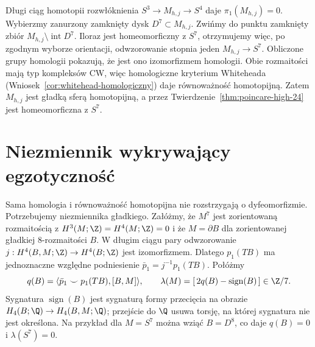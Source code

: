Długi ciąg homotopii rozwłóknienia
$S^3\to M_{h,j}\to S^4$ daje
$\pi_1(M_{h,j})=0$.
Wybierzmy zanurzony zamknięty dysk
$D^7\subset M_{h,j}$. Zwińmy do punktu
zamknięty zbiór
$M_{h,j}\setminus\operatorname{int}D^7$.
Iloraz jest homeomorficzny z $S^7$,
otrzymujemy więc, po zgodnym wyborze
orientacji, odwzorowanie stopnia jeden
$M_{h,j}\to S^7$.
Obliczone grupy homologii pokazują,
że jest ono izomorfizmem homologii.
Obie rozmaitości mają typ kompleksów CW,
więc homologiczne kryterium Whiteheada
(Wniosek~\ref{cor:whitehead-homologiczny})
daje równoważność homotopijną.
Zatem $M_{h,j}$ jest gładką
sferą homotopijną, a przez
Twierdzenie~\ref{thm:poincare-high-24}
jest homeomorficzna z $S^7$.

\section{Niezmiennik wykrywający egzotyczność}
\label{sec:milnor-invariant-25}

Sama homologia i równoważność
homotopijna nie rozstrzygają
o dyfeomorfizmie. Potrzebujemy
niezmiennika gładkiego.
Załóżmy, że $M^7$ jest
zorientowaną rozmaitością
z $H^3(M;\Z)=H^4(M;\Z)=0$
i że $M=\partial B$ dla
zorientowanej gładkiej
$8$-rozmaitości $B$.
W długim ciągu pary
odwzorowanie
$j:H^4(B,M;\Z)\to H^4(B;\Z)$
jest izomorfizmem.
Dlatego $p_1(TB)$ ma
jednoznaczne względne podniesienie
$\bar p_1=j^{-1}p_1(TB)$.
Połóżmy
\[
 q(B)=\langle
    \bar p_1\smile p_1(TB),[B,M]\rangle,
 \qquad
 \lambda(M)=[\,2q(B)-\operatorname{sign}(B)\,]
                    \in\Z/7.
\]
Sygnatura $\operatorname{sign}(B)$
jest sygnaturą formy przecięcia
na obrazie
$H_4(B;\Q)\to H_4(B,M;\Q)$;
przejście do $\Q$ usuwa torsję,
na której sygnatura nie jest określona.
Na przykład dla $M=S^7$
można wziąć $B=D^8$,
co daje $q(B)=0$ i
$\lambda(S^7)=0$.

